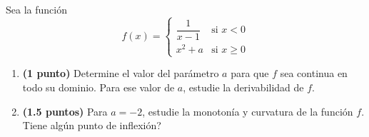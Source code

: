 
Sea la función
\[
f(x)=\begin{cases}
\dfrac{1}{x-1} & \text{si } x<0\\[0.8em]
x^2+a & \text{si } x\geq 0
\end{cases}
\]
\begin{enumerate}[label=\alph*),leftmargin=2.4em]
  \item \textbf{(1 punto)} Determine el valor del parámetro \(a\) para que \(f\) sea continua en todo su dominio. Para ese valor de \(a\), estudie la derivabilidad de \(f\).
  \item \textbf{(1.5 puntos)} Para \(a=-2\), estudie la monotonía y curvatura de la función \(f\). \textquestiondown{}Tiene algún punto de inflexión?
\end{enumerate}
